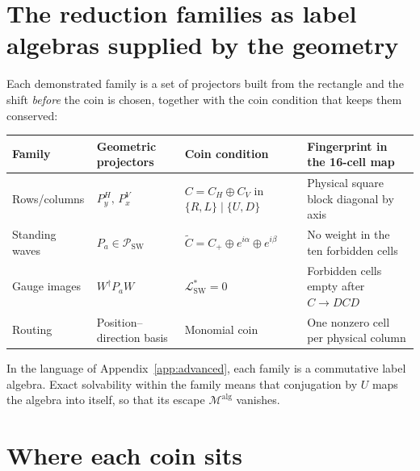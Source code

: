 \documentclass[11pt,a4paper,oneside]{report}
\newcommand{\sw}{\mathrm{SW}}
\numberwithin{equation}{chapter}
\begin{document}
\section{The reduction families as label algebras supplied by the geometry}

Each demonstrated family is a set of projectors built from the rectangle
and the shift \emph{before} the coin is chosen, together with the coin
condition that keeps them conserved:
\begin{center}\small
\begin{tabularx}{\textwidth}{@{}lYYY@{}}\toprule
Family&Geometric projectors&Coin condition&Fingerprint in the 16-cell map\\\midrule
Rows/columns&\(P^H_y,\,P^V_x\)&\(C=C_H\oplus C_V\) in \(\{R,L\}\mid\{U,D\}\)&Physical square block diagonal by axis\\
Standing waves&\(P_a\in\mathscr P_{\sw}\)&\(\widetilde C=C_+\oplus e^{i\alpha}\oplus e^{i\beta}\)&No weight in the ten forbidden cells\\
Gauge images&\(W^\dagger P_aW\)&\(\mathcal L^*_{\sw}=0\)&Forbidden cells empty after \(C\to DCD\)\\
Routing&Position--direction basis&Monomial coin&One nonzero cell per physical column\\\bottomrule
\end{tabularx}
\end{center}
In the language of Appendix~\ref{app:advanced}, each family is a
commutative label algebra. Exact solvability within the family means
that conjugation by \(U\) maps the algebra into itself, so that its
escape \(\mathcal M^{\mathrm{alg}}\) vanishes.

\section{Where each coin sits}
\end{document}
